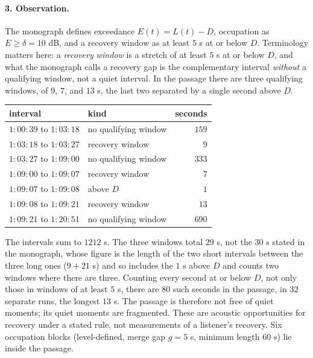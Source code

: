 \paragraph{3. Observation.} The monograph defines exceedance $E(t)=L(t)-D$, occupation as $E\ge\delta=10$ dB, and a recovery window as at least $5$ s at or below $D$. Terminology matters here: a \emph{recovery window} is a stretch of at least $5$ s at or below $D$, and what the monograph calls a recovery gap is the complementary interval \emph{without} a qualifying window, not a quiet interval. In the passage there are three qualifying windows, of $9$, $7$, and $13$ s, the last two separated by a single second above $D$.
\begin{center}
\small
\begin{tabular}{llr}
\toprule
interval & kind & seconds\\
\midrule
$1{:}00{:}39$ to $1{:}03{:}18$ & no qualifying window & $159$\\
$1{:}03{:}18$ to $1{:}03{:}27$ & recovery window & $9$\\
$1{:}03{:}27$ to $1{:}09{:}00$ & no qualifying window & $333$\\
$1{:}09{:}00$ to $1{:}09{:}07$ & recovery window & $7$\\
$1{:}09{:}07$ to $1{:}09{:}08$ & above $D$ & $1$\\
$1{:}09{:}08$ to $1{:}09{:}21$ & recovery window & $13$\\
$1{:}09{:}21$ to $1{:}20{:}51$ & no qualifying window & $690$\\
\bottomrule
\end{tabular}
\end{center}
The intervals sum to $1212$ s. The three windows total $29$ s, not the $30$ s stated in the monograph, whose figure is the length of the two short intervals between the three long ones ($9+21$ s) and so includes the $1$ s above $D$ and counts two windows where there are three. Counting every second at or below $D$, not only those in windows of at least $5$ s, there are $80$ such seconds in the passage, in $32$ separate runs, the longest $13$ s. The passage is therefore not free of quiet moments; its quiet moments are fragmented. These are acoustic opportunities for recovery under a stated rule, not measurements of a listener's recovery. Six occupation blocks (level-defined, merge gap $g=5$ s, minimum length $60$ s) lie inside the passage.
